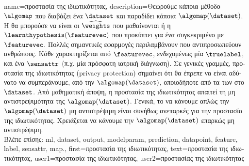 {name={\foreignlanguage{greek}{προστασία της ιδιωτικότητας}},
	description={\foreignlanguage{greek}{Θεωρούμε κάποια μέθοδο}  
		$\algomap$ \foreignlanguage{greek}{που διαβάζει ένα}  $\dataset$ \foreignlanguage{greek}{και παραδίδει κάποια} 
		 $\algomap(\dataset)$. \foreignlanguage{greek}{Η}  \foreignlanguage{greek}{θα μπορούσε να είναι οι} 
		 $\widehat{\weights}$ \foreignlanguage{greek}{που μαθαί\-νονται ή η}  
		$\learnthypothesis(\featurevec)$ \foreignlanguage{greek}{που προκύπτει για ένα συγκεκριμένο}  
		\foreignlanguage{greek}{με}  $\featurevec$. \foreignlanguage{greek}{Πολλές σημαντικές εφαρμογές}  
		\foreignlanguage{greek}{περιλαμβάνουν}  \foreignlanguage{greek}{που αντιπροσωπεύουν ανθρώπους. Κάθε} 
		 \foreignlanguage{greek}{χαρακτηρίζεται από}  $\featurevec$, 
		\foreignlanguage{greek}{ενδεχομένως μία}  $\truelabel$, \foreignlanguage{greek}{και ένα}  
		$\sensattr$ \foreignlanguage{greek}{(π.χ. μία πρόσφατη ιατρική διάγνωση). Σε γενικές γραμμές, προστασία της ιδιωτικότητας} (privacy protection) 
		\foreignlanguage{greek}{σημαίνει ότι θα έπρεπε να είναι αδύνατο να συμπεράνουμε, από την}  $\algomap(\dataset)$, 
		\foreignlanguage{greek}{οποιοδήποτε από τα}  \foreignlanguage{greek}{των}  
		\foreignlanguage{greek}{στο} $\dataset$. \foreignlanguage{greek}{Από μαθηματική άποψη, η προστασία της ιδιωτικότητας απαιτεί τη μη 
		αντιστρεψιμότητα της}  $\algomap(\dataset)$. \foreignlanguage{greek}{Γενικά, το να κάνουμε απλώς την 
		$\algomap(\dataset)$ μη αντιστρέψιμη είναι συνήθως ανεπαρκές για την προστασία της ιδιωτικότητας. Χρειάζεται να κάνουμε την 
		$\algomap(\dataset)$ επαρκώς μη αντιστρέψιμη.}
		\\
		\foreignlanguage{greek}{Βλέπε επίσης:} \gls{ml}, \gls{dataset}, \gls{output}, \gls{modelparam}, \gls{prediction}, \gls{datapoint}, \gls{feature}, 
		\gls{label}, \gls{sensattr}, \gls{map}.}, 
	first={\foreignlanguage{greek}{προστασία της ιδιωτικότητας}}, 
	text={\foreignlanguage{greek}{προστασία της ιδιωτικότητας}},
	user1={\foreignlanguage{greek}{προστασία της ιδιωτικότητας}}, %
   	user2={\foreignlanguage{greek}{προστασίας της ιδιωτικότητας}} %
}


